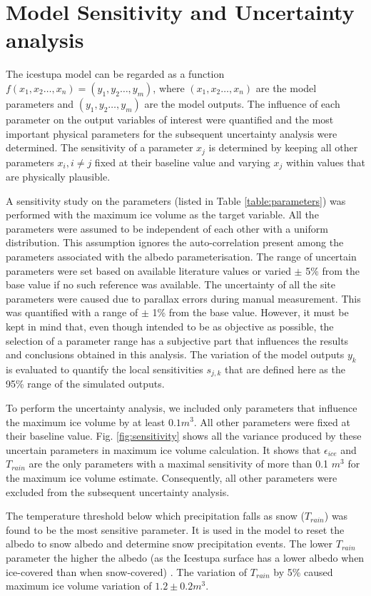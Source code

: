 \documentclass[utf8]{frontiersSCNS} %
\begin{document}
\section{Model Sensitivity and Uncertainty analysis}

The icestupa model can be regarded as a function $f(x_1,x_2 \dots, x_n) = (y_1,y_2 \dots, y_m)$, where $(x_1,x_2
\dots, x_n)$ are the model parameters and $(y_1,y_2 \dots, y_m)$ are the model outputs. The influence of each
parameter on the output variables of interest were quantified and the most important physical parameters for the
subsequent uncertainty analysis were determined. The sensitivity of a parameter $x_j$ is determined by keeping all
other parameters $x_i, i \neq j$ fixed at their baseline value and varying $x_j$ within values that are physically
plausible.

A sensitivity study on the parameters (listed in Table \ref{table:parameters}) was performed with the maximum ice
volume as the target variable. All the parameters were assumed to be independent of each other with a uniform
distribution.  This assumption ignores the auto-correlation present among the parameters associated with the albedo
parameterisation.  The range of uncertain parameters were set based on available literature values or varied $\pm$ 5\%
from the base value if no such reference was available. The uncertainty of all the site parameters were caused due to
parallax errors during manual measurement. This was quantified with a range of $\pm$ 1\% from the base value. However,
it must be kept in mind that, even though intended to be as objective as possible, the selection of a parameter range
has a subjective part that influences the results and conclusions obtained in this analysis.  The variation of the
model outputs $y_k$ is evaluated to quantify the local sensitivities $s_{j,k}$ that are defined here as the 95\% range
of the simulated outputs.

To perform the uncertainty analysis, we included only parameters that influence the maximum ice volume by at least $0.1
m^3$. All other parameters were fixed at their baseline value.  Fig. \ref{fig:sensitivity} shows all the variance
produced by these uncertain parameters in maximum ice volume calculation. It shows that $\epsilon_{ice}$ and $T_{rain}$
are the only parameters with a maximal sensitivity of more than 0.1 $m^3$ for the maximum ice volume estimate.
Consequently, all other parameters were excluded from the subsequent uncertainty analysis. 

The temperature threshold below which precipitation falls as snow ($T_{rain}$) was found to be the most sensitive
parameter. It is used in the model to reset the albedo to snow albedo and determine snow precipitation events. The
lower $T_{rain}$ parameter the higher the albedo (as the Icestupa surface has a lower albedo when ice-covered than when
snow-covered) . The variation of $T_{rain}$ by 5\% caused maximum ice volume variation of $1.2 \pm 0.2 m^3$. 
\end{document}

